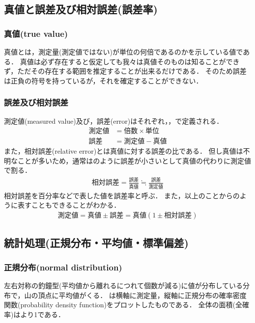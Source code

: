 \subsection{真値と誤差及び相対誤差(誤差率)\cite{1130000797667922816}}
\subsubsection{真値(true value)}
真値とは，測定量(測定値ではない)が単位の何倍であるのかを示している値である．
真値は必ず存在すると仮定しても我々は真値そのものは知ることができず，ただその存在する範囲を推定することが出来るだけである．
そのため誤差は正負の符号を持っているが，それを確定することができない．
\subsubsection{誤差及び相対誤差}
測定値(measured value)及び，誤差(error)はそれぞれ，，で定義される．
\begin{align}
	測定値 &= 倍数 \times 単位\label{eq:keisoku}\\
	誤差 &= 測定値 − 真値\label{eq:gosa}
\end{align}
また，相対誤差(relative error)とは真値に対する誤差の比である．
但し真値は不明なことが多いため，通常はのように誤差が小さいとして真値の代わりに測定値で割る．
\begin{eqnarray}
	相対誤差 = \frac{誤差}{真値} \fallingdotseq \frac{誤差}{測定値}
	\label{eq:soutaigosa}
\end{eqnarray}
相対誤差を百分率などで表した値を誤差率と呼ぶ．
また，以上のことからのように表すこともできることがわかる\cite{1130000797042387712}．
\begin{eqnarray}
	測定値=真値 \pm 誤差=真値(1\pm 相対誤差)
\label{eq:hutasikasa}
\end{eqnarray}

\subsection{統計処理(正規分布・平均値・標準偏差)}
\subsubsection{正規分布(normal distribution)\cite{1130848328216058496}\cite{6602}}
左右対称の釣鐘型(平均値から離れるにつれて個数が減る)に値が分布している分布で，山の頂点に平均値がくる．
は横軸に測定量，縦軸に正規分布の確率密度関数(probability density function)をプロットしたものである．
全体の面積(全確率)はより1である．

